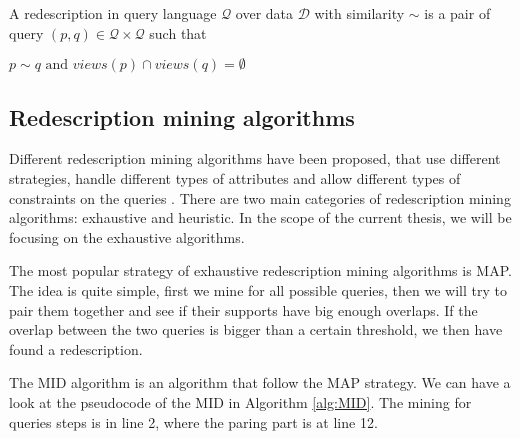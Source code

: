 \begin{definition}
    A redescription in query language $\mathcal{Q}$ over data $\mathcal{D}$ with similarity $\sim$ is a pair of query $(p, q) \in \mathcal{Q} \times \mathcal{Q}$ such that

    \begin{math}
        p \sim q \text{ and } views(p) \cap views(q) = \emptyset
    \end{math}
\end{definition}

\subsection{Redescription mining algorithms}
Different redescription mining algorithms have been proposed, that use different strategies, handle different types of attributes and allow different types of constraints on the queries \cite{galbrun2018redescription}.
There are two main categories of redescription mining algorithms: exhaustive and heuristic.
In the scope of the current thesis, we will be focusing on the exhaustive algorithms.

The most popular strategy of exhaustive redescription mining algorithms is \ac{MAP}.
The idea is quite simple, first we mine for all possible queries, then we will try to pair them together and see if their supports have big enough overlaps.
If the overlap between the two queries is bigger than a certain threshold, we then have found a redescription.

The \ac{MID} algorithm is an algorithm that follow the \ac{MAP} strategy.
We can have a look at the pseudocode of the \acl{MID} in Algorithm \ref{alg:MID}.
The mining for queries steps is in line 2, where the paring part is at line 12.

